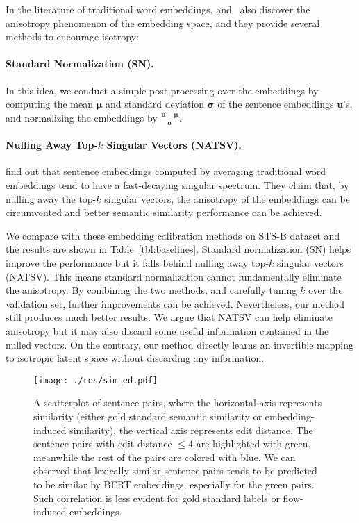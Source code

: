 \documentclass[11pt,a4paper]{article}
\newcommand{\vect}[1]{\boldsymbol{\mathbf{#1}}}
\def\rvu{{\mathbf{i}}}
\def\rvu{{\mathbf{u}}}
\begin{document}
In the literature of traditional word embeddings, \citet{arora2016simple} and~\citet{mu2017all} also discover the anisotropy phenomenon of the embedding space, and they provide several methods to encourage isotropy:

\paragraph{Standard Normalization (SN).}
In this idea, we conduct a simple post-processing over the embeddings by computing the mean $\vect{\mu}$ and standard deviation $\vect{\sigma}$ of the sentence embeddings $\rvu$'s, and normalizing the embeddings by $\frac{\rvu - \vect{\mu}}{\vect{\sigma}}$.

\paragraph{Nulling Away Top-$k$ Singular Vectors (NATSV).} 
\citet{mu2017all} find out that sentence embeddings computed by averaging traditional word embeddings  tend to have a fast-decaying singular spectrum. They claim that, by nulling away the top-$k$ singular vectors, the anisotropy of the embeddings can be circumvented and better semantic similarity performance can be achieved.

We compare with these embedding calibration methods on STS-B dataset and the results are shown in Table~\ref{tbl:baselines}.
Standard normalization (SN) helps improve the performance but it falls behind nulling away top-$k$ singular vectors (NATSV). This means standard normalization cannot fundamentally eliminate the anisotropy. By combining the two methods, and carefully tuning $k$ over the validation set, further improvements can be achieved. Nevertheless, our method still produces much better results. We argue that NATSV can help eliminate anisotropy but it may also discard some useful information contained in the nulled vectors. On the contrary, our method directly learns an invertible mapping to isotropic latent space without discarding any information. 




\begin{figure*}[!t]
	\centering
	\texttt{[image: ./res/sim\_ed.pdf]}
	\caption{\label{fig:sim_ed} A scatterplot of sentence pairs, where the horizontal axis represents similarity (either gold standard semantic similarity or embedding-induced similarity), the vertical axis represents edit distance. The sentence pairs with edit distance $\leq 4$ are highlighted with {\color{green} green}, meanwhile the rest of the pairs are colored with {\color{blue} blue}. We can observed that lexically similar sentence pairs tends to be predicted to be similar by BERT embeddings, especially for the green pairs. Such correlation is less evident for gold standard labels or flow-induced embeddings. }
	\vspace{-10pt}
\end{figure*}
\end{document}
